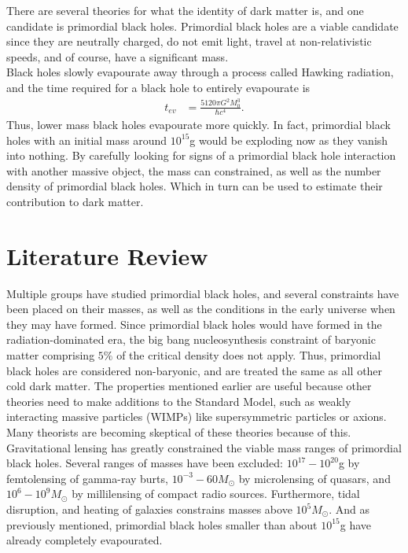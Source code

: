 There are several theories for what the identity of dark matter is, and one candidate is primordial black holes. Primordial black holes are a viable candidate since they are neutrally charged, do not emit light, travel at non-relativistic speeds, and of course, have a significant mass. \\

Black holes slowly evapourate away through a process called Hawking radiation, and the time required for a black hole to entirely evapourate is 
\begin{align*}
t_{ev} &= \frac{5120 \pi G^2 M_0^3}{\hbar c^4}.
\end{align*}
Thus, lower mass black holes evapourate more quickly. In fact, primordial black holes with an initial mass around $10^{15}$g would be exploding now as they vanish into nothing. By carefully looking for signs of a primordial black hole interaction with another massive object, the mass can constrained, as well as the number density of primordial black holes. Which in turn can be used to estimate their contribution to dark matter.

\section{Literature Review}

Multiple groups have studied primordial black holes, and several constraints have been placed on their masses, as well as the conditions in the early universe when they may have formed. Since primordial black holes would have formed in the radiation-dominated era, the big bang nucleosynthesis constraint of baryonic matter comprising $5\%$ of the critical density does not apply. Thus, primordial black holes are considered non-baryonic, and are treated the same as all other cold dark matter. The properties mentioned earlier are useful because other theories need to make additions to the Standard Model, such as weakly interacting massive particles (WIMPs) like supersymmetric particles or axions. Many theorists are becoming skeptical of these theories because of this. \\

Gravitational lensing has greatly constrained the viable mass ranges of primordial black holes. Several ranges of masses have been excluded: $10^{17}-10^{20}$g by femtolensing of gamma-ray burts, $10^{-3}-60 M_\odot$ by microlensing of quasars, and $10^6-10^9 M_\odot$ by millilensing of compact radio sources. Furthermore, tidal disruption, and heating of galaxies constrains masses above $10^5 M_\odot$. And as previously mentioned, primordial black holes smaller than about $10^{15}$g have already completely evapourated. 

